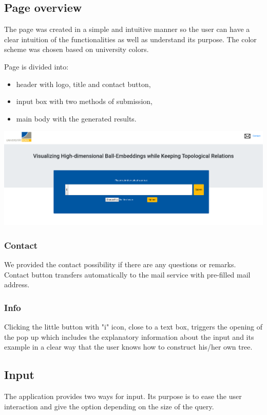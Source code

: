 \documentclass[]{article}
\begin{document}
\subsection{Page overview}
The page was created in a simple and intuitive manner so the user can have a clear intuition of the functionalities as well as understand its purpose. The color scheme was chosen based on university colors. 

Page is divided into: 
\begin{itemize}
	\item header with logo, title and contact button,
	\item input box with two methods of submission,
	\item main body with the generated results.
\end{itemize}

\includegraphics[width=\textwidth]{res/page.png}

\subsubsection{Contact}
We provided the contact possibility if there are any questions or remarks. Contact button transfers automatically to the mail service with pre-filled mail address.

\subsubsection{Info}
Clicking the little button with "i" icon, close to a text box, triggers the opening of the pop up which includes the explanatory information about the input and its example in a clear way that the user knows how to construct his/her own tree. 

\subsection{Input}
The application provides two ways for input. Its purpose is to ease the user interaction and give the option depending on the size of the query. 
\end{document}
